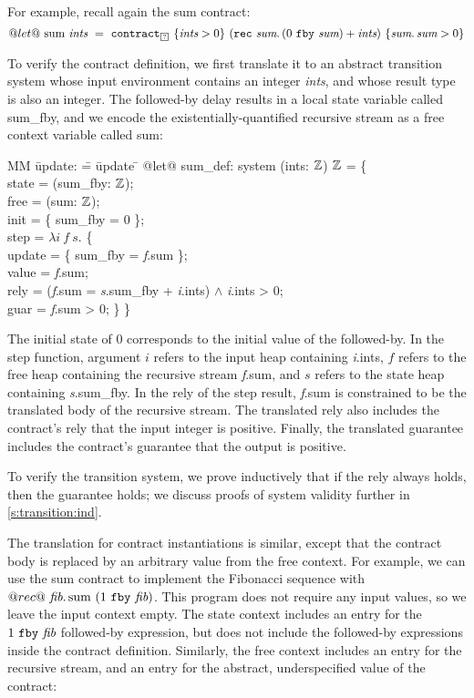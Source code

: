 For example, recall again the sum contract:
$$
@let@~\text{sum}~\textit{ints}~=~\sumcontractX{\PSUnknown}{\textit{ints}}
$$

To verify the contract definition, we first translate it to an abstract transition system whose input environment contains an integer \emph{ints}, and whose result type is also an integer.
The followed-by delay results in a local state variable called sum_fby, and we encode the existentially-quantified recursive stream as a free context variable called sum:

  \begin{tabbing}
  MM \= update: \= = \= update \= \kill
  @let@ sum_def: system (ints: $\mathbb{Z}$) $\mathbb{Z}$ = \{ \\
  \> state   \> = (sum_fby: $\mathbb{Z}$); \\
  \> free  \> = (sum: $\mathbb{Z}$); \\
  \> init  \> = \{ sum_fby = 0 \}; \\
  \> step  \> = $\lambda{} i~f~s.$ \{ \\
  \> \> \> update \> = \{ sum_fby = \textit{f}.sum \}; \\
  \> \> \> value  \> = \textit{f}.sum; \\
  \> \> \> rely   \> = (\textit{f}.sum = \textit{s}.sum_fby + \textit{i}.ints) $\wedge$ \textit{i}.ints > 0; \\
  \> \> \> guar   \> = \textit{f}.sum > 0; \} \}
  \end{tabbing}

The initial state of 0 corresponds to the initial value of the followed-by.
In the step function, argument $i$ refers to the input heap containing \textit{i}.ints, $f$ refers to the free heap containing the recursive stream \textit{f}.sum, and $s$ refers to the state heap containing \textit{s}.sum_fby.
In the rely of the step result, \textit{f}.sum is constrained to be the translated body of the recursive stream.
The translated rely also includes the contract's rely that the input integer is positive.
Finally, the translated guarantee includes the contract's guarantee that the output is positive.

To verify the transition system, we prove inductively that if the rely always holds, then the guarantee holds; we discuss proofs of system validity further in \autoref{s:transition:ind}.

The translation for contract instantiations is similar, except that the contract body is replaced by an arbitrary value from the free context.
For example, we can use the sum contract to implement the Fibonacci sequence with
$
  @rec@~\textit{fib}.\, \text{sum}~(1~\texttt{fby}~\textit{fib})
$.
This program does not require any input values, so we leave the input context empty.
The state context includes an entry for the $1~\texttt{fby}~\textit{fib}$ followed-by expression, but does not include the followed-by expressions inside the contract definition.
Similarly, the free context includes an entry for the recursive stream, and an entry for the abstract, underspecified value of the contract:

